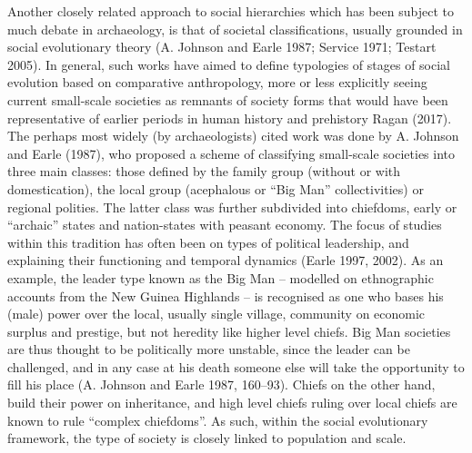 \documentclass[
  12pt,
  a4paper, twoside]{book}
\begin{document}
Another closely related approach to social hierarchies which has been subject to much debate in archaeology, is that of societal classifications, usually grounded in social evolutionary theory (A. Johnson and Earle 1987; Service 1971; Testart 2005). In general, such works have aimed to define typologies of stages of social evolution based on comparative anthropology, more or less explicitly seeing current small-scale societies as remnants of society forms that would have been representative of earlier periods in human history and prehistory Ragan (2017). The perhaps most widely (by archaeologists) cited work was done by A. Johnson and Earle (1987), who proposed a scheme of classifying small-scale societies into three main classes: those defined by the family group (without or with domestication), the local group (acephalous or ``Big Man'' collectivities) or regional polities. The latter class was further subdivided into chiefdoms, early or ``archaic'' states and nation-states with peasant economy. The focus of studies within this tradition has often been on types of political leadership, and explaining their functioning and temporal dynamics (Earle 1997, 2002). As an example, the leader type known as the Big Man -- modelled on ethnographic accounts from the New Guinea Highlands -- is recognised as one who bases his (male) power over the local, usually single village, community on economic surplus and prestige, but not heredity like higher level chiefs. Big Man societies are thus thought to be politically more unstable, since the leader can be challenged, and in any case at his death someone else will take the opportunity to fill his place (A. Johnson and Earle 1987, 160--93). Chiefs on the other hand, build their power on inheritance, and high level chiefs ruling over local chiefs are known to rule ``complex chiefdoms''. As such, within the social evolutionary framework, the type of society is closely linked to population and scale.
\end{document}
